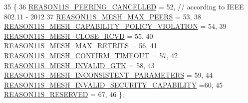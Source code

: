 \begin{DoxyCode}
35 \{
36   \hyperlink{group__dot11s_gga1132ec5975c87960ceb86ea54481aba6ab7a7fcea22d68ba038856480ea34fdd8}{REASON11S\_PEERING\_CANCELLED} = 52, \textcolor{comment}{// according to IEEE 802.11 - 2012}
37   \hyperlink{group__dot11s_gga1132ec5975c87960ceb86ea54481aba6ab70ebebb2518212636d97aa78a083169}{REASON11S\_MESH\_MAX\_PEERS} = 53,
38   \hyperlink{group__dot11s_gga1132ec5975c87960ceb86ea54481aba6aae9441b25fc7316ae53a6e73398521e5}{REASON11S\_MESH\_CAPABILITY\_POLICY\_VIOLATION} = 54,
39   \hyperlink{group__dot11s_gga1132ec5975c87960ceb86ea54481aba6a66a9d95025c42e4e00d49efa6ece82a3}{REASON11S\_MESH\_CLOSE\_RCVD} = 55,
40   \hyperlink{group__dot11s_gga1132ec5975c87960ceb86ea54481aba6ab4a78ee9f92e1a9644447dc6d895f317}{REASON11S\_MESH\_MAX\_RETRIES} = 56,
41   \hyperlink{group__dot11s_gga1132ec5975c87960ceb86ea54481aba6adb681bf7add7cb193a7e9b3e0147875c}{REASON11S\_MESH\_CONFIRM\_TIMEOUT} = 57,
42   \hyperlink{group__dot11s_gga1132ec5975c87960ceb86ea54481aba6a992af53cebe30af98c1acc0054bb7bae}{REASON11S\_MESH\_INVALID\_GTK} = 58,
43   \hyperlink{group__dot11s_gga1132ec5975c87960ceb86ea54481aba6a98ddea6f69878fdde8dba52112bdd96d}{REASON11S\_MESH\_INCONSISTENT\_PARAMETERS} = 59,
44   \hyperlink{group__dot11s_gga1132ec5975c87960ceb86ea54481aba6aab89215a9518c367d4998f025fffa630}{REASON11S\_MESH\_INVALID\_SECURITY\_CAPABILITY} =60,
45   \hyperlink{group__dot11s_gga1132ec5975c87960ceb86ea54481aba6a1e76395872503ccadd9cf008e325b3d8}{REASON11S\_RESERVED} = 67,
46 \};
\end{DoxyCode}
